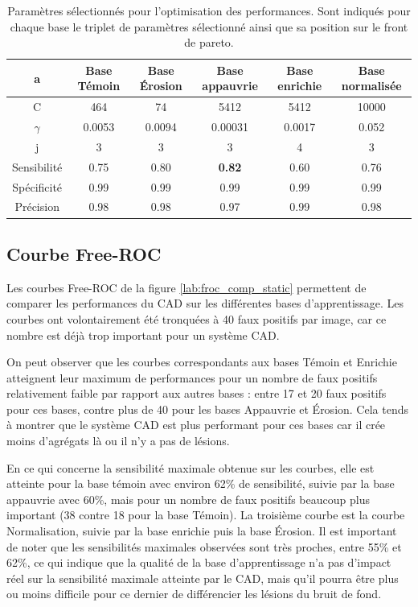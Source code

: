 \begin{table}[h!]
		\begin{tabular}{c c c c c c}
  \hline
  a	& Base Témoin 	& Base Érosion	& Base appauvrie& Base enrichie & Base normalisée \\
  \hline
 C 	& 464		& 74		& 5412		& 5412		& 10000 \\
\hline
$\gamma$& 0.0053	& 0.0094	& 0.00031	& 0.0017	& 0.052 \\
\hline
j	& 3		& 3		& 3		& 4		& 3	\\
\hline
\hline
Sensibilité& 0.75	& 0.80		& \textbf{0.82}		& 0.60		& 0.76	\\
\hline
Spécificité& 0.99	& 0.99		& 0.99		& 0.99		& 0.99 \\
\hline
Précision& 0.98		& 0.98		& 0.97		& 0.99		& 0.98 \\
\hline
 		\end{tabular}

\caption{Paramètres sélectionnés pour l'optimisation des performances. Sont indiqués pour chaque base le triplet de paramètres sélectionné ainsi que sa position sur le front de pareto.}
\label{fig:paramsParams}
\end{table}

\FloatBarrier

\subsection{Courbe Free-ROC}

Les courbes Free-ROC de la figure \ref{lab:froc_comp_static} permettent de comparer les performances du CAD sur les différentes bases d'apprentissage. Les courbes ont volontairement été tronquées à 40 faux positifs par image, car ce nombre est déjà trop important pour un système CAD.

On peut observer que les courbes correspondants aux bases Témoin et Enrichie atteignent leur maximum de performances pour un nombre de faux positifs relativement faible par rapport aux autres bases : entre 17 et 20 faux positifs pour ces bases, contre plus de 40 pour les bases Appauvrie et \'Erosion. Cela tends à montrer que le système CAD est plus performant pour ces bases car il crée moins d'agrégats là ou il n'y a pas de lésions.

En ce qui concerne la sensibilité maximale obtenue sur les courbes, elle est atteinte pour la base témoin avec environ 62\% de sensibilité, suivie par la base appauvrie avec 60\%, mais pour un nombre de faux positifs beaucoup plus important (38 contre 18 pour la base Témoin). La troisième courbe est la courbe Normalisation, suivie par la base enrichie puis la base \'Erosion. Il est important de noter que les sensibilités maximales observées sont très proches, entre 55\% et 62\%, ce qui indique que la qualité de la base d'apprentissage n'a pas d'impact réel sur la sensibilité maximale atteinte par le CAD, mais qu'il pourra être plus ou moins difficile pour ce dernier de différencier les lésions du bruit de fond. 

